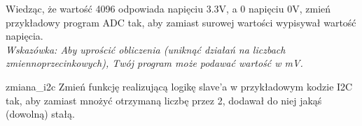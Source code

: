 \documentclass{pdfBooklets}
\begin{document}
\begin{Zadanie}{}
Wiedząc, że wartość 4096 odpowiada napięciu 3.3V, a 0 napięciu 0V, zmień przykładowy program ADC tak, aby zamiast surowej
wartości wypisywał wartość napięcia.\\
\textit{Wskazówka: Aby uprościć obliczenia (uniknąć działań na liczbach zmiennoprzecinkowych), Twój program może podawać wartość w mV.}
\end{Zadanie}

\begin{Zadanie}{}{zmiana_i2c}
  Zmień funkcję realizującą logikę slave'a w przykładowym kodzie I2C tak, aby zamiast mnożyć otrzymaną liczbę przez 2, dodawał do niej jakąś
  (dowolną) stałą.
\end{Zadanie}

\end{document}
